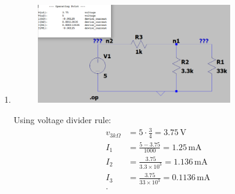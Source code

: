 \documentclass{zc-ust-hw}
\begin{document}
\maketitle

\begin{enumerate}

  \item
    \begin{figure}[htpb]
      \centering
      \includegraphics[width=0.8\textwidth]{figures/1.png}
      \caption{}
      \label{fig:figures-1-png}
    \end{figure}
    \begin{sol}
      Using voltage divider rule:
      \begin{align}
        v_{3k\Omega} &= 5\cdot \frac{3}{4} = 3.75\,\mathrm{V}\\
        I_1 &= \frac{5-3.75}{1000} = 1.25\,\mathrm{mA}\\
        I_2 &= \frac{3.75}{3.3\times 10^3} = 1.136\,\mathrm{mA}\\
        I_3 &= \frac{3.75}{33\times 10^3} = 0.1136\,\mathrm{mA}\\
      .\end{align}
    \end{sol}

    \newpage


\end{enumerate}
\end{document}
